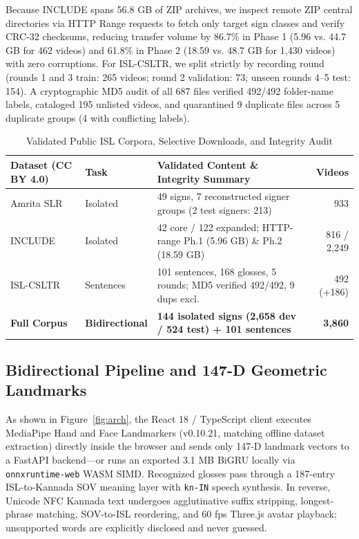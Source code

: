 \documentclass[a4paper,12pt]{article}
\begin{document}
Because INCLUDE spans 56.8 GB of ZIP archives, we inspect remote ZIP central directories via HTTP Range requests to fetch only target sign classes and verify CRC-32 checksums, reducing transfer volume by 86.7\% in Phase 1 (5.96 vs. 44.7 GB for 462 videos) and 61.8\% in Phase 2 (18.59 vs. 48.7 GB for 1,430 videos) with zero corruptions. For ISL-CSLTR, we split strictly by recording round (rounds 1 and 3 train: 265 videos; round 2 validation: 73; unseen rounds 4--5 test: 154). A cryptographic MD5 audit of all 687 files verified 492/492 folder-name labels, cataloged 195 unlisted videos, and quarantined 9 duplicate files across 5 duplicate groups (4 with conflicting labels).

\begin{table}[h!]
\centering
\caption{Validated Public ISL Corpora, Selective Downloads, and Integrity Audit}
\label{tab:datasets}
\small
\begin{tabular}{lllr}
\toprule
\textbf{Dataset (CC BY 4.0)} & \textbf{Task} & \textbf{Validated Content \& Integrity Summary} & \textbf{Videos} \\
\midrule
Amrita SLR \cite{amrita2025slr} & Isolated & 49 signs, 7 reconstructed signer groups (2 test signers: 213) & 933 \\
INCLUDE \cite{sridhar2020include} & Isolated & 42 core / 122 expanded; HTTP-range Ph.1 (5.96 GB) \& Ph.2 (18.59 GB) & 816 / 2,249 \\
ISL-CSLTR \cite{elakkiya2021islcsltr} & Sentences & 101 sentences, 168 glosses, 5 rounds; MD5 verified 492/492, 9 dups excl. & 492 (+186) \\
\midrule
\textbf{Full Corpus} & \textbf{Bidirectional} & \textbf{144 isolated signs (2,658 dev / 524 test) + 101 sentences} & \textbf{3,860} \\
\bottomrule
\end{tabular}
\end{table}

\subsection{Bidirectional Pipeline and 147-D Geometric Landmarks}
As shown in Figure~\ref{fig:arch}, the React 18 / TypeScript client executes MediaPipe Hand and Face Landmarkers (v0.10.21, matching offline dataset extraction) directly inside the browser and sends only 147-D landmark vectors to a FastAPI backend---or runs an exported 3.1 MB BiGRU locally via \texttt{onnxruntime-web} WASM SIMD. Recognized glosses pass through a 187-entry ISL-to-Kannada SOV meaning layer with \texttt{kn-IN} speech synthesis. In reverse, Unicode NFC Kannada text undergoes agglutinative suffix stripping, longest-phrase matching, SOV-to-ISL reordering, and 60 fps Three.js avatar playback; unsupported words are explicitly disclosed and never guessed.
\end{document}
